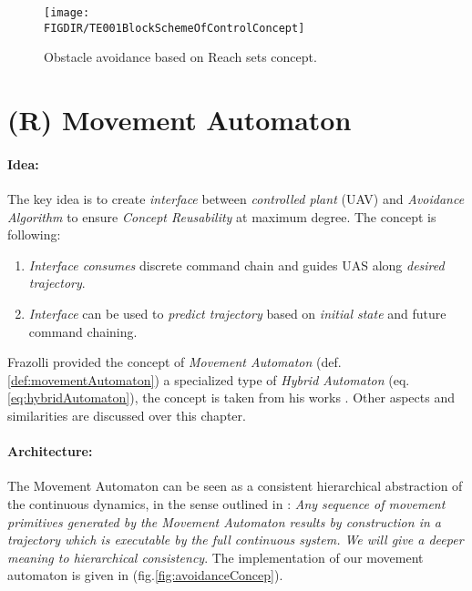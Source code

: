 \begin{figure}[H]
    \centering
    \texttt{[image: \\FIGDIR/TE001BlockSchemeOfControlConcept]} 
    \caption{Obstacle avoidance based on Reach sets concept.}
    \label{fig:avoidanceConcept}
\end{figure}

\section{(R) Movement Automaton}\label{s:movementAutomatonTheory}

\paragraph{Idea:} The key idea is to create \emph{interface} between \emph{controlled plant} (UAV) and \emph{Avoidance Algorithm} to ensure \emph{Concept Reusability} at maximum degree.  The concept is following:

\begin{enumerate}

    \item \emph{Interface consumes} discrete command chain and guides UAS along \emph{desired trajectory}.
    
    \item \emph{Interface} can be used to \emph{predict trajectory} based on \emph{initial state} and future command chaining. 
\end{enumerate}

Frazolli provided the concept of \emph{Movement Automaton} (def. \ref{def:movementAutomaton}) a specialized type of \emph{Hybrid Automaton} (eq. \ref{eq:hybridAutomaton}), the concept is taken from his works \cite{frazzoli2001robust,frazzoli2000trajectory}. Other aspects and similarities are discussed over this chapter. 


\paragraph{Architecture:} The Movement Automaton can be seen as a consistent hierarchical abstraction of the continuous dynamics, in the sense outlined in \cite{pappas2000hierarchically}: \emph{Any sequence of movement primitives generated by the Movement Automaton results by construction in a trajectory which is executable by the full continuous system. We will give a deeper meaning to hierarchical consistency}. The implementation of our movement automaton is given in (fig.\ref{fig:avoidanceConcep}). 

